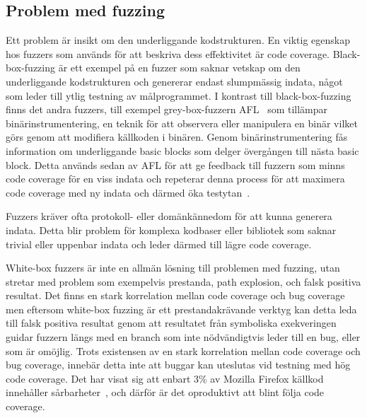 \subsection{Problem med fuzzing} Ett problem är insikt om den underliggande
kodstrukturen. En viktig egenskap hos fuzzers som används för att beskriva dess
effektivitet är code coverage. Black-box-fuzzing är ett exempel på en fuzzer som
saknar vetskap om den underliggande kodstrukturen och genererar endast
slumpmässig indata, något som leder till ytlig testning av målprogrammet. I
kontrast till black-box-fuzzing finns det andra fuzzers, till exempel
grey-box-fuzzern AFL~\cite{aflplusplus} som tillämpar binärinstrumentering, en
teknik för att observera eller manipulera en binär vilket görs genom att
modifiera källkoden i binären. Genom binärinstrumentering fås information om
underliggande basic blocks som delger övergången till nästa basic block. Detta
används sedan av AFL för att ge feedback till fuzzern som minns code coverage
för en viss indata och repeterar denna process för att maximera code coverage
med ny indata och därmed öka testytan~\cite{challenges_fuzzing}.

Fuzzers kräver ofta protokoll- eller domänkännedom för att kunna generera
indata. Detta blir problem för komplexa kodbaser eller bibliotek som saknar
trivial eller uppenbar indata och leder därmed till lägre code coverage.

White-box fuzzers är inte en allmän lösning till problemen med fuzzing, utan
stretar med problem som exempelvis prestanda, path explosion, och falsk positiva
resultat. Det finns en stark korrelation mellan code coverage och bug
coverage~\cite{directed_greybox_fuzzing} men eftersom white-box fuzzing är ett
prestandakrävande verktyg kan detta leda till falsk positiva resultat genom att
resultatet från symboliska exekveringen guidar fuzzern längs med en branch som
inte nödvändigtvis leder till en bug, eller som är omöjlig. Trots existensen av
en stark korrelation mellan code coverage och bug coverage, innebär detta inte
att buggar kan uteslutas vid testning med hög code coverage. Det har visat sig
att enbart 3\% av Mozilla Firefox källkod innehåller
sårbarheter~\cite{fault_prediction_vuln_pred}, och därför är det oproduktivt att
blint följa code coverage.
